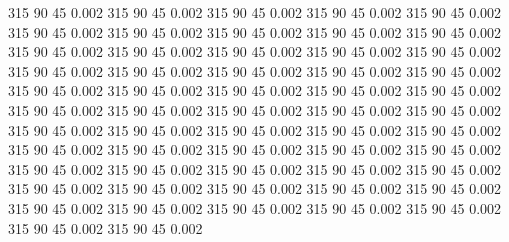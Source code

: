 315            90            45         0.002
315            90            45         0.002
315            90            45         0.002
315            90            45         0.002
315            90            45         0.002
315            90            45         0.002
315            90            45         0.002
315            90            45         0.002
315            90            45         0.002
315            90            45         0.002
315            90            45         0.002
315            90            45         0.002
315            90            45         0.002
315            90            45         0.002
315            90            45         0.002
315            90            45         0.002
315            90            45         0.002
315            90            45         0.002
315            90            45         0.002
315            90            45         0.002
315            90            45         0.002
315            90            45         0.002
315            90            45         0.002
315            90            45         0.002
315            90            45         0.002
315            90            45         0.002
315            90            45         0.002
315            90            45         0.002
315            90            45         0.002
315            90            45         0.002
315            90            45         0.002
315            90            45         0.002
315            90            45         0.002
315            90            45         0.002
315            90            45         0.002
315            90            45         0.002
315            90            45         0.002
315            90            45         0.002
315            90            45         0.002
315            90            45         0.002
315            90            45         0.002
315            90            45         0.002
315            90            45         0.002
315            90            45         0.002
315            90            45         0.002
315            90            45         0.002
315            90            45         0.002
315            90            45         0.002
315            90            45         0.002
315            90            45         0.002
315            90            45         0.002
315            90            45         0.002
315            90            45         0.002
315            90            45         0.002
315            90            45         0.002
315            90            45         0.002
315            90            45         0.002
